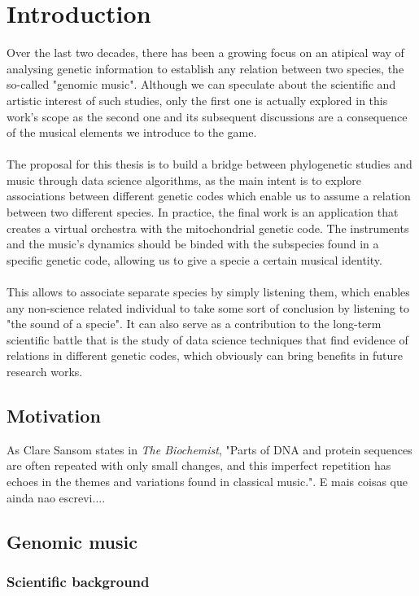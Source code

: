 \documentclass[11pt,twoside,a4paper]{report}
\begin{document}
\chapter{Introduction}
Over the last two decades, there has been a growing focus on an atipical way of analysing genetic information to establish any relation between two species, the so-called "genomic music". Although we can speculate about the scientific and artistic interest of such studies, only the first one is actually explored in this work's scope as the second one and its subsequent discussions are a consequence of the musical elements we introduce to the game. 
\\\\The proposal for this thesis is to build a bridge between phylogenetic studies and music through data science algorithms, as the main intent is to explore associations between different genetic codes which enable us to assume a relation between two different species. In practice, the final work is an application that creates a virtual orchestra with the mitochondrial genetic code. The instruments and the music's dynamics should be binded with the subspecies found in a specific genetic code, allowing us to give a specie a certain musical identity.\\ 
\\This allows to associate separate species by simply listening them, which enables any non-science related individual to take some sort of conclusion by listening to "the sound of a specie". It can also serve as a contribution to the long-term scientific battle that is the study of data science techniques that find evidence of relations in different genetic codes, which obviously can bring benefits in future research works.


\section{Motivation}
As Clare Sansom states in \textit{The Biochemist}, "Parts of DNA and protein sequences are often repeated with only small changes, and this imperfect repetition has echoes in the themes and variations found in classical music.".
E mais coisas que ainda nao escrevi....

\section{Genomic music}
\subsection{Scientific background}
\end{document}
